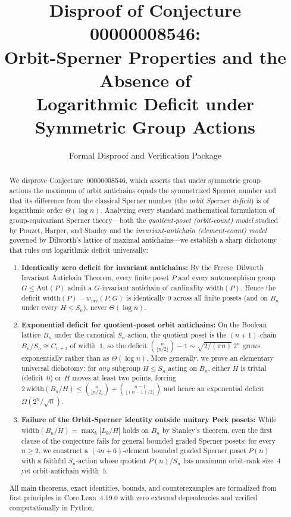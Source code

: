 \documentclass[11pt,a4paper]{article}
\title{\textbf{Disproof of Conjecture 00000008546:\\
Orbit-Sperner Properties and the Absence of\\
Logarithmic Deficit under Symmetric Group Actions}}
\author{Formal Disproof and Verification Package}
\date{}
\theoremstyle{definition}
\newcommand{\Bn}{B_n}
\newcommand{\Sn}{S_n}
\newcommand{\Aut}{\mathrm{Aut}}
\newcommand{\width}{\mathrm{width}}
\newcommand{\winv}{w_{\mathrm{inv}}}
\begin{document}
\maketitle

\begin{abstract}
We disprove Conjecture~00000008546, which asserts that under symmetric group actions the maximum of orbit antichains equals the symmetrized Sperner number and that its difference from the classical Sperner number (the \emph{orbit Sperner deficit}) is of logarithmic order $\Theta(\log n)$. Analyzing every standard mathematical formulation of group-equivariant Sperner theory---both the \emph{quotient-poset (orbit-count) model} studied by Pouzet, Harper, and Stanley and the \emph{invariant-antichain (element-count) model} governed by Dilworth's lattice of maximal antichains---we establish a sharp dichotomy that rules out logarithmic deficit universally:
\begin{enumerate}
  \item \textbf{Identically zero deficit for invariant antichains:} By the Freese--Dilworth Invariant Antichain Theorem, every finite poset $P$ and every automorphism group $G \le \Aut(P)$ admit a $G$-invariant antichain of cardinality $\width(P)$. Hence the deficit $\width(P) - \winv(P,G)$ is identically $0$ across all finite posets (and on $\Bn$ under every $H \le \Sn$), never $\Theta(\log n)$.
  \item \textbf{Exponential deficit for quotient-poset orbit antichains:} On the Boolean lattice $\Bn$ under the canonical $\Sn$-action, the quotient poset is the $(n+1)$-chain $\Bn/\Sn \cong C_{n+1}$ of width~$1$, so the deficit $\binom{n}{\lfloor n/2 \rfloor} - 1 \sim \sqrt{2/(\pi n)}\,2^n$ grows exponentially rather than as $\Theta(\log n)$. More generally, we prove an elementary universal dichotomy: for \emph{any} subgroup $H \le \Sn$ acting on $\Bn$, either $H$ is trivial (deficit~$0$) or $H$ moves at least two points, forcing $2\,\width(\Bn/H) \le \binom{n}{\lfloor n/2 \rfloor} + \binom{n-1}{\lfloor (n-1)/2 \rfloor}$ and hence an exponential deficit $\Omega(2^n/\sqrt{n})$.
  \item \textbf{Failure of the Orbit-Sperner identity outside unitary Peck posets:} While $\width(\Bn/H) = \max_k |L_k/H|$ holds on $\Bn$ by Stanley's theorem, even the first clause of the conjecture fails for general bounded graded Sperner posets: for every $n \ge 2$, we construct a $(4n+6)$-element bounded graded Sperner poset $P(n)$ with a faithful $\Sn$-action whose quotient $P(n)/\Sn$ has maximum orbit-rank size~$4$ yet orbit-antichain width~$5$.
\end{enumerate}
All main theorems, exact identities, bounds, and counterexamples are formalized from first principles in Core Lean~4.19.0 with zero external dependencies and verified computationally in Python.
\end{abstract}
\end{document}
